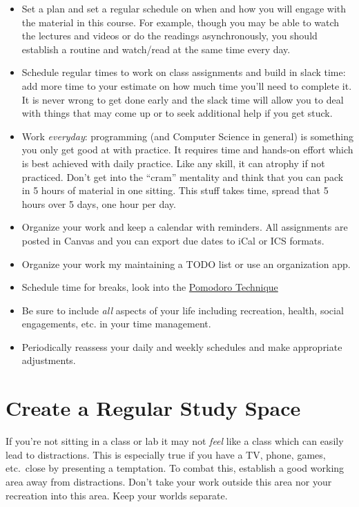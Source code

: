 \documentclass[12pt]{scrartcl}
\begin{document}
\begin{itemize}
  \item Set a plan and set a regular schedule on when and how you will
  engage with the material in this course. For example, though you may be able to 
  watch the lectures and videos or do the readings asynchronously, you
  should establish a routine and watch/read at the same time every day.
  \item Schedule regular times to work on class assignments and build in
  slack time: add more time to your estimate on how much time you'll need 
  to complete it.  It is never wrong to get done early and the slack time
  will allow you to deal with things that may come up or to seek additional
  help if you get stuck.
  \item Work \emph{everyday}: programming (and Computer Science in general) is
  something you only get good at with practice.  It requires time and
  hands-on effort which is best achieved with daily practice.  Like any skill, 
  it can atrophy if not practiced.  Don't get into the ``cram'' mentality 
  and think that you can pack in 5 hours of material in one sitting.  This
  stuff takes time, spread that 5 hours over 5 days, one hour per day.
  \item Organize your work and keep a calendar with reminders.  All assignments
  are posted in Canvas and you can export due dates to iCal or ICS formats.
  \item Organize your work my maintaining a TODO list or use an organization
  app.
  \item Schedule time for breaks, look into the \href{https://en.wikipedia.org/wiki/Pomodoro_Technique}{Pomodoro Technique}
  \item Be sure to include \emph{all} aspects of your life including recreation, 
  health, social engagements, etc. in your time management.  
  \item Periodically reassess your daily and weekly schedules and make appropriate
  adjustments.  
\end{itemize}  
  
\section{Create a Regular Study Space}

If you're not sitting in a class or lab it may not \emph{feel}
like a class which can easily lead to distractions.  This is
especially true if you have a TV, phone, games, etc.\ close by
presenting a temptation.  To combat this, establish a good working 
area away from distractions.  Don't take your work outside this
area nor your recreation into this area.  Keep your worlds separate.
\end{document}
